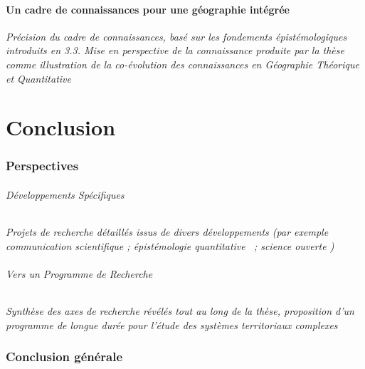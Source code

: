 \subsection{Un cadre de connaissances pour une géographie intégrée}

\textit{Précision du cadre de connaissances, basé sur les fondements épistémologiques introduits en 3.3. Mise en perspective de la connaissance produite par la thèse comme illustration de la co-évolution des connaissances en Géographie Théorique et Quantitative~\cite{raimbault2017theo}}



\part*{Conclusion}


\section*{Perspectives}

\paragraph{Développements Spécifiques}

\textit{Projets de recherche détaillés issus de divers développements (par exemple communication scientifique 
\cite{serra2016game} ; épistémologie quantitative~\cite{raimbault2016techno} ; science ouverte
\cite{cybergeo20})}


\paragraph{Vers un Programme de Recherche}

\textit{Synthèse des axes de recherche révélés tout au long de la thèse, proposition d'un programme de longue durée pour l'étude des systèmes territoriaux complexes}



\section*{Conclusion générale}



